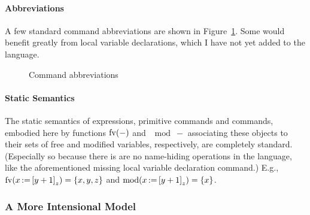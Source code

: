 \documentclass[11pt]{article}
\begin{document}
\paragraph{Abbreviations} A few standard command abbreviations are shown in Figure~\ref{fig:command-abbreviations}. Some would benefit greatly from local variable declarations, which I have not yet added to the language. 

\begin{figure}[ht]
	\centering
	\caption{\label{fig:command-abbreviations} Command abbreviations}
\end{figure}

\paragraph{Static Semantics} The static semantics of expressions, primitive commands and commands, embodied here by functions $\mathrm{fv}(-)$ and $\mod{-}$ associating these objects to their sets of free and modified variables, respectively, are completely standard. (Especially so because there is are no name-hiding operations in the language, like the aforementioned missing local variable declaration command.) E.g., $\mathrm{fv}(x \operatorname{:\!=} \left[ y+1 \right]_z) = \left\lbrace x,y,z \right\rbrace$ and $\mathrm{mod}(x \operatorname{:\!=} \left[ y+1 \right]_z) = \left\lbrace x \right\rbrace$.  

\subsubsection{A More Intensional Model}
\end{document}

